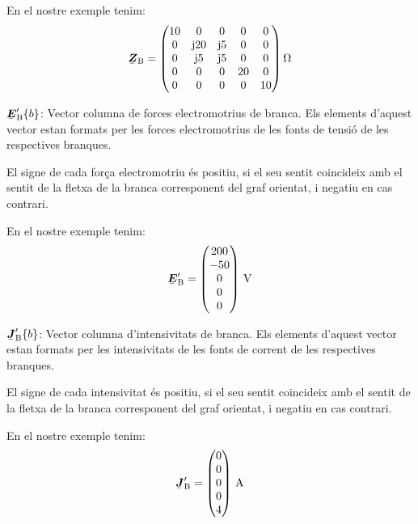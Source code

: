 \begin{list}{}
   En el nostre exemple tenim:
   \[
      \mcmplx{Z}\ped{B} = \begin{pmatrix}
            10 & 0 & 0 & 0 & 0 \\
            0 & \ju 20 & \ju 5 & 0 & 0 \\
            0 & \ju 5 & \ju 5 & 0 & 0 \\
            0 & 0 & 0 & 20 & 0 \\
            0 & 0 & 0 & 0 & 10
      \end{pmatrix}\si{\ohm}
   \]

   \item[$\mcmplx{E}'\ped{B}\{b\}$:] Vector columna de forces electromotrius de branca. Els elements d'aquest vector estan formats per les forces electromotrius de les fonts de tensi\'{o} de les respectives branques.

El signe de cada for\c{c}a electromotriu \'{e}s positiu, si el seu sentit coincideix amb el sentit de la fletxa de la branca corresponent del graf orientat, i negatiu en cas contrari.

   En el nostre exemple tenim:
   \[
      \mcmplx{E}'\ped{B} = \begin{pmatrix} 200 \\ -50 \\ 0 \\ 0 \\ 0 \end{pmatrix}\unit{V}
   \]

   \item[$\mcmplx{J}'\ped{B}\{b\}$:] Vector columna d'intensivitats de branca. Els elements d'aquest vector estan formats per les intensivitats de les fonts de corrent de les respectives branques.

El signe de cada intensivitat \'{e}s positiu, si el seu sentit coincideix amb el sentit de la fletxa de la branca corresponent del graf orientat, i negatiu en cas contrari.

   En el nostre exemple tenim:
   \[
      \mcmplx{J}'\ped{B} = \begin{pmatrix} 0 \\ 0 \\ 0 \\ 0 \\ 4 \end{pmatrix}\unit{A}
   \]

\end{list}

